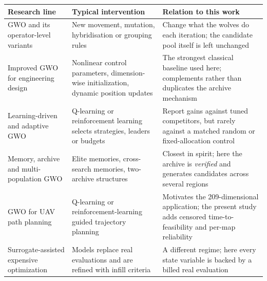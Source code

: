 \begin{tabular}{p{3.9cm}p{4.6cm}p{5.6cm}}
\toprule
Research line & Typical intervention & Relation to this work \\
\midrule
GWO and its operator-level variants & New movement, mutation, hybridisation or grouping rules \citep{nadimishahraki2024iot,makhadmeh2023review,wang2019igwode,zhang2025mutation,singh2025tlbo,zhang2025bagwo,shaikh2025hybrid,li2021sustainability} & Change what the wolves do each iteration; the candidate pool itself is left unchanged \\
Improved GWO for engineering design & Nonlinear control parameters, dimension-wise initialization, dynamic position updates \citep{nadimi2021igwo} & The strongest classical baseline used here; complements rather than duplicates the archive mechanism \\
Learning-driven and adaptive GWO & Q-learning or reinforcement learning selects strategies, leaders or budgets \citep{yin2026amsgwo,huang2026qlfdgwo,khalid2026aogwo,wang2026dmsgwo} & Report gains against tuned competitors, but rarely against a matched random or fixed-allocation control \\
Memory, archive and multi-population GWO & Elite memories, cross-search memories, two-archive structures \citep{zamani2026egwo,tejani2025twoarchive} & Closest in spirit; here the archive is \emph{verified} and generates candidates across several regions \\
GWO for UAV path planning & Q-learning or reinforcement-learning guided trajectory planning \citep{nayeem2025drones,jia2025drones,huang2026qlfdgwo} & Motivates the 209-dimensional application; the present study adds censored time-to-feasibility and per-map reliability \\
Surrogate-assisted expensive optimization & Models replace real evaluations and are refined with infill criteria \citep{yu2021multimodel,liu2024survey,zhao2025surrogate} & A different regime; here every state variable is backed by a billed real evaluation \\
\bottomrule
\end{tabular}
